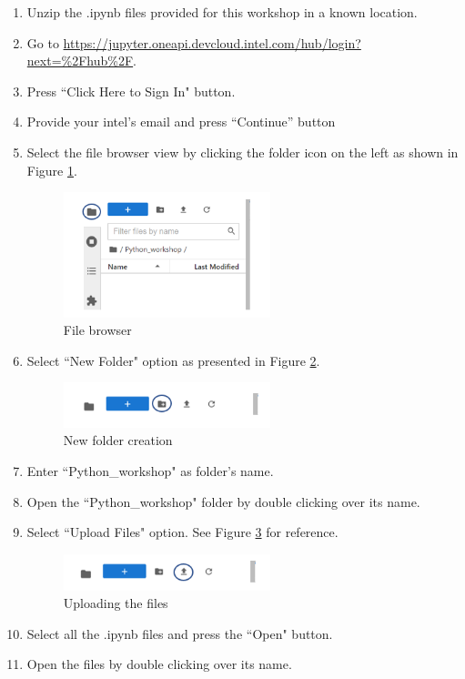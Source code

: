\documentclass{assignment}
\begin{document}
\begin{enumerate}
    \item Unzip the .ipynb files provided for this workshop in a known location. 
    \item Go to \href{https://jupyter.oneapi.devcloud.intel.com/hub/login?next=%2Fhub%2F}{https://jupyter.oneapi.devcloud.intel.com/hub/login?next=\%2Fhub\%2F}.
    \item Press ``Click Here to Sign In" button.
    \item Provide your intel’s email and press “Continue” button 
    \item { 
        Select the file browser view by clicking the folder icon on the left as shown in Figure \ref{fig:import_0}.
        \begin{figure}[h]
         \centering 
            \includegraphics[width=6cm]{assets/intel_devcloud_login.png}
            \caption{File browser}
            \label{fig:import_0}
        \end{figure}
    }
\newpage
    \item {
        Select ``New Folder" option as presented in Figure \ref{fig:import_1}.
        \begin{figure}[h]
         \centering 
            \includegraphics[width=6cm]{assets/intel_devcloud_new_folder.png}
            \caption{New folder creation}
            \label{fig:import_1}
        \end{figure}
    }
    \item Enter ``Python\_workshop" as folder’s name.
    \item Open the ``Python\_workshop" folder by double clicking over its name.
    \item {
        Select ``Upload Files" option. See Figure \ref{fig:import_2} for reference.
        \begin{figure}[h]
         \centering 
            \includegraphics[width=6cm]{assets/intel_devcloud_upload.png}
            \caption{Uploading the files}
            \label{fig:import_2}
        \end{figure}        
    }
    \item Select all the .ipynb files and press the ``Open" button.
    \item Open the files by double clicking over its name.
\end{enumerate}
\end{document}
